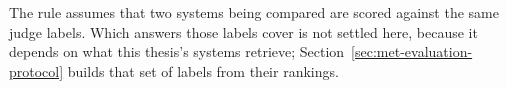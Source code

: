 The rule assumes that two systems being compared are scored against the same judge
labels. Which answers those labels cover is not settled here, because it depends on
what this thesis's systems retrieve; Section~\ref{sec:met-evaluation-protocol} builds
that set of labels from their rankings.

